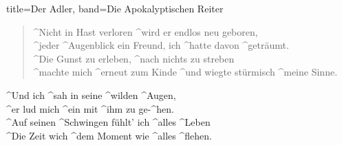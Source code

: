\begin{song}{title=Der Adler, band=Die Apokalyptischen Reiter}
    \begin{verse}
        ^Nicht in Hast verloren ^wird er endlos neu geboren, \\
        ^jeder ^Augenblick ein Freund, ich ^hatte davon ^geträumt. \\
        ^Die Gunst zu erleben, ^nach nichts zu streben \\
        ^machte mich ^erneut zum Kinde ^und wiegte stürmisch ^meine Sinne. \\
    \end{verse}

    \begin{chorus}
        ^Und ich ^sah in seine ^wilden ^Augen, \\
        ^er lud mich ^ein mit ^ihm zu ge-^hen. \\
        ^Auf seinen ^Schwingen fühlt' ich ^alles ^Leben \\
        ^Die Zeit wich ^dem Moment wie ^alles ^flehen. \\
    \end{chorus}
\end{song}